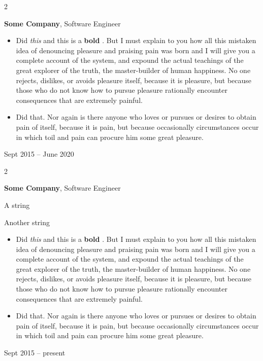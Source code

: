 \documentclass[10pt, letterpaper]{article}
\newenvironment{summary}{
    \begin{description}[
        topsep=0.10 cm,
        parsep=0.10 cm,
        partopsep=0pt,
        itemsep=0pt,
        leftmargin=0.4 cm + 10pt
    ]
}{
    \end{description}
} %
\newenvironment{highlights}{
    \begin{itemize}[
        topsep=0.10 cm,
        parsep=0.10 cm,
        partopsep=0pt,
        itemsep=0pt,
        leftmargin=0.4 cm + 10pt
    ]
}{
    \end{itemize}
} %
\newenvironment{twocolentry}[2][]{
    \onecolentry
    \def\secondColumn{#2}
    \setcolumnwidth{\fill, 4.5 cm}
    \begin{paracol}{2}
}{
    \switchcolumn \raggedleft \secondColumn
    \end{paracol}
    \endonecolentry
} %
\let\hrefWithoutArrow\href
\renewcommand{\href}[2]{\hrefWithoutArrow{#1}{\ifthenelse{\equal{#2}{}}{ }{#2 }\raisebox{.15ex}{\footnotesize \faExternalLink*}}}
\begin{document}
        \begin{twocolentry}{
            Sept 2015 – June 2020
        }
            \textbf{Some \textnormal{Company}}, Software Engineer
            \begin{highlights}
                \item Did \textit{this} and this is a \textbf{bold} \href{https://example.com}{link}. But I must explain to you how all this mistaken idea of denouncing pleasure and praising pain was born and I will give you a complete account of the system, and expound the actual teachings of the great explorer of the truth, the master-builder of human happiness. No one rejects, dislikes, or avoids pleasure itself, because it is pleasure, but because those who do not know how to pursue pleasure rationally encounter consequences that are extremely painful.
                \item Did that. Nor again is there anyone who loves or pursues or desires to obtain pain of itself, because it is pain, but because occasionally circumstances occur in which toil and pain can procure him some great pleasure.
            \end{highlights}
        \end{twocolentry}


        \vspace{0.2 cm}

        \begin{twocolentry}{
            Sept 2015 – present
        }
            \textbf{Some \textnormal{Company}}, Software Engineer
            \begin{summary}
                \item A string
                \item Another string
            \end{summary}
            \begin{highlights}
                \item Did \textit{this} and this is a \textbf{bold} \href{https://example.com}{link}. But I must explain to you how all this mistaken idea of denouncing pleasure and praising pain was born and I will give you a complete account of the system, and expound the actual teachings of the great explorer of the truth, the master-builder of human happiness. No one rejects, dislikes, or avoids pleasure itself, because it is pleasure, but because those who do not know how to pursue pleasure rationally encounter consequences that are extremely painful.
                \item Did that. Nor again is there anyone who loves or pursues or desires to obtain pain of itself, because it is pain, but because occasionally circumstances occur in which toil and pain can procure him some great pleasure.
            \end{highlights}
        \end{twocolentry}
\end{document}
